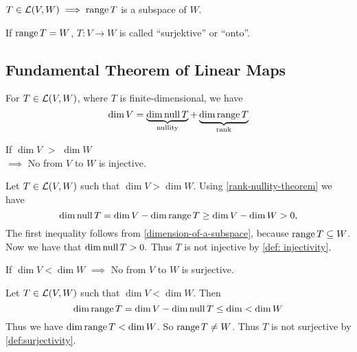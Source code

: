 \setcounter{thm}{17}
\begin{thm} 
  \label{thm: the range is a subspace}
  $T\in \mathcal{L}(V,W) \implies \operatorname{range} T$ is a subspace of $W$.
\end{thm}

\setcounter{thm}{18}
\begin{mydef} [surjectivity]
  \label{def: surjectivity}
  If $\operatorname{range} T=W$, $T:V\to W$ is called ``surjektive'' or ``onto''.
\end{mydef}

\subsection{Fundamental Theorem of Linear Maps}

  \setcounter{thm}{20}
  \begin{thm} 
    \label{rank-nullity-theorem}
    For $T \in {\mathcal{L}(V,W)}$, where $T$ is finite-dimensional, we have
    \begin{equation}
      \dim V =
      \underbrace{ \dim \operatorname{null} T }_{\text{nullity}}
      + \underbrace{\dim \operatorname{range} T}_{\text{rank}}
    \end{equation}
  \end{thm}

  \setcounter{thm}{21}
  \begin{thm} 
    \label{thm: linear-map-to-a-lower-dimensional-space-is-not-injective}
    If $\dim V$ $>$ $\dim W$ \\ 
    $\implies$ No \lm from $V$ to $W$ is injective.
  \end{thm}
  \begin{prf} Let $T\in \mathcal{L}(V,W)$ such that $\dim V > \dim W$. Using \ref{rank-nullity-theorem} we have
    \begin{equation}
      \dim \operatorname{null} T = \dim V - \dim \operatorname{range} T \geq \dim V - \dim W > 0,
    \end{equation}
    The first inequality follows from \ref{dimension-of-a-subspace}, because $\operatorname{range} T \subseteq W$. Now we have that $\dim \operatorname{null} T > 0.$ Thus $T$ is not injective by \autoref{def: injectivity}.
  \end{prf}

  \setcounter{thm}{23}
  \begin{thm} 
    If $\dim V < \dim W$ $\implies$ No \lm from $V$ to $W$ is surjective.
  \end{thm}
  \begin{prf}
    Let $T\in \mathcal{L} (V,W)$ such that $\dim V < \dim W$. Then
    \begin{equation}
      \dim \operatorname{range} T = \dim V - \dim \operatorname{null} T \leq \dim < \dim W
    \end{equation}
    Thus we have $\dim \operatorname{range} T < \dim W$. So $\operatorname{range} T \neq W$. Thus $T$ is not surjective by \autoref{def:surjectivity}.
  \end{prf}
   
